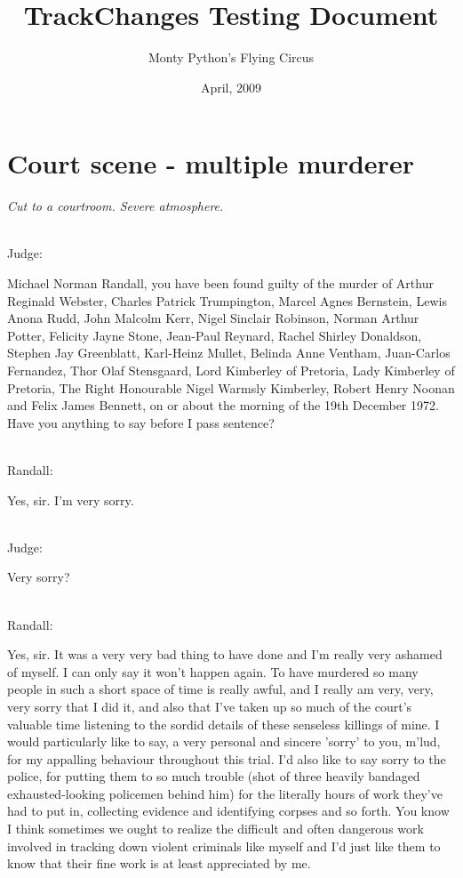 \documentclass{report}
\title{TrackChanges Testing Document}
\author{Monty Python's Flying Circus}
\date{April, 2009}
\begin{document}
\maketitle

\chapter{Court scene - multiple murderer}

\emph{Cut to a courtroom. Severe atmosphere.}

\noindent\\ Judge:

Michael Norman Randall, you have been found guilty of the murder of Arthur Reginald Webster, Charles Patrick Trumpington, Marcel Agnes Bernstein, Lewis Anona Rudd, John Malcolm Kerr, Nigel Sinclair Robinson, Norman Arthur Potter, Felicity Jayne Stone, Jean-Paul Reynard, Rachel Shirley Donaldson, Stephen Jay Greenblatt, Karl-Heinz Mullet, Belinda Anne Ventham, Juan-Carlos Fernandez, Thor Olaf Stensgaard, Lord Kimberley of Pretoria, Lady Kimberley of Pretoria, The Right Honourable Nigel Warmsly Kimberley, Robert Henry Noonan and Felix James Bennett, on or about the morning of the 19th December 1972. Have you anything to say before I pass sentence?


\noindent\\ Randall: 	

Yes, sir. I'm very sorry.

\noindent\\ Judge: 	

Very sorry?

\noindent\\ Randall: 	

Yes, sir. It was a very very bad thing to have done and I'm really very ashamed of myself. I can only say it won't happen again. To have murdered so many people in such a short space of time is really awful, and I really am very, very, very sorry that I did it, and also that I've taken up so much of the court's valuable time listening to the sordid details of these senseless killings of mine. I would particularly like to say, a very personal and sincere 'sorry' to you, m'lud, for my appalling behaviour throughout this trial. I'd also like to say sorry to the police, for putting them to so much trouble (shot of three heavily bandaged exhausted-looking policemen behind him) for the literally hours of work they've had to put in, collecting evidence and identifying corpses and so forth. You know I think sometimes we ought to realize the difficult and often dangerous work involved in tracking down violent criminals like myself and I'd just like them to know that their fine work is at least appreciated by me.
\end{document}
